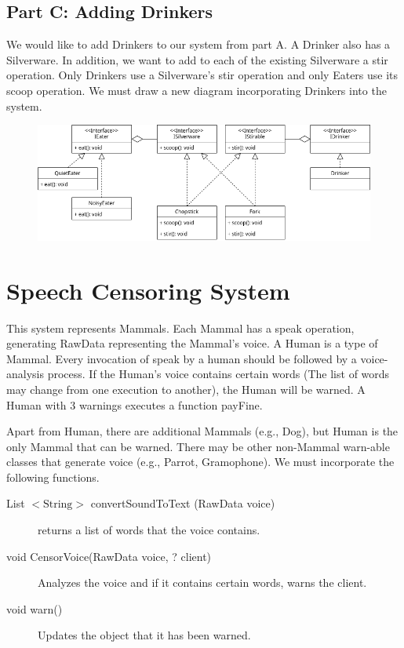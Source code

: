 \documentclass{article}
\begin{document}
\subsection*{Part C: Adding Drinkers}

We would like to add Drinkers to our system from part A. A Drinker also has a Silverware. In addition, we want to add to each of the existing Silverware a stir operation. Only Drinkers use a Silverware's stir operation and only Eaters use its scoop operation. We must draw a new diagram incorporating Drinkers into the system.

\begin{figure}[ht]
	\includegraphics[width=\textwidth]{hw4q1c.png}
\end{figure}

\section{Speech Censoring System}

This system represents Mammals. Each Mammal has a speak operation, generating RawData representing the Mammal's voice. A Human is a type of Mammal. Every invocation of speak by a human should be followed by a voice-analysis process. If the Human's voice contains certain words (The list of words may change from one execution to another), the Human will be warned. A Human with 3 warnings executes a function payFine.

Apart from Human, there are additional Mammals (e.g., Dog), but Human is the only Mammal that can be warned. There may be other non-Mammal warn-able classes that generate voice (e.g., Parrot, Gramophone). We must incorporate the following functions.

\begin{description}
	\item[List \(<\text{String}>\) convertSoundToText (RawData voice)] returns a list of words that the voice contains.
	\item[void CensorVoice(RawData voice, ? client)] Analyzes the voice and if it contains certain words, warns the client.
	\item[void warn()] Updates the object that it has been warned.
\end{description}
\end{document}

